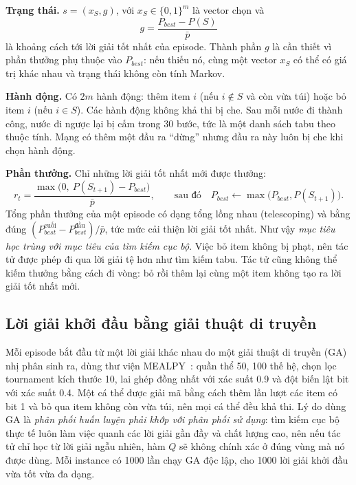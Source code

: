 \textbf{Trạng thái.} $s=(x_S,g)$, với $x_S\in\{0,1\}^m$ là vector chọn và
\begin{equation}
g=\frac{P_{best}-P(S)}{\bar p}
\end{equation}
là khoảng cách tới lời giải tốt nhất của episode. Thành phần $g$ là cần thiết vì phần thưởng phụ thuộc vào $P_{best}$: nếu thiếu nó, cùng một vector $x_S$ có thể có giá trị khác nhau và trạng thái không còn tính Markov.

\textbf{Hành động.} Có $2m$ hành động: thêm item $i$ (nếu $i\notin S$ và còn vừa túi) hoặc bỏ item $i$ (nếu $i\in S$). Các hành động không khả thi bị che. Sau mỗi nước đi thành công, nước đi ngược lại bị cấm trong 30 bước, tức là một danh sách tabu theo thuộc tính. Mạng có thêm một đầu ra ``dừng'' nhưng đầu ra này luôn bị che khi chọn hành động.

\textbf{Phần thưởng.} Chỉ những lời giải tốt nhất mới được thưởng:
\begin{equation}
r_t=\frac{\max\big(0,\ P(S_{t+1})-P_{best}\big)}{\bar p},
\qquad\text{sau đó}\quad P_{best}\leftarrow\max\big(P_{best},P(S_{t+1})\big).
\label{eq:reward}
\end{equation}
Tổng phần thưởng của một episode có dạng tổng lồng nhau (telescoping) và bằng đúng $(P_{best}^{\text{cuối}}-P_{best}^{\text{đầu}})/\bar p$, tức mức cải thiện lời giải tốt nhất. Như vậy \emph{mục tiêu học trùng với mục tiêu của tìm kiếm cục bộ}. Việc bỏ item không bị phạt, nên tác tử được phép đi qua lời giải tệ hơn như tìm kiếm tabu. Tác tử cũng không thể kiếm thưởng bằng cách đi vòng: bỏ rồi thêm lại cùng một item không tạo ra lời giải tốt nhất mới.

\subsection{Lời giải khởi đầu bằng giải thuật di truyền}

Mỗi episode bắt đầu từ một lời giải khác nhau do một giải thuật di truyền (GA) nhị phân sinh ra, dùng thư viện MEALPY~\cite{VanThieu2023}: quần thể 50, 100 thế hệ, chọn lọc tournament kích thước 10, lai ghép đồng nhất với xác suất 0.9 và đột biến lật bit với xác suất 0.4. Một cá thể được giải mã bằng cách thêm lần lượt các item có bit 1 và bỏ qua item không còn vừa túi, nên mọi cá thể đều khả thi. Lý do dùng GA là \emph{phân phối huấn luyện phải khớp với phân phối sử dụng}: tìm kiếm cục bộ thực tế luôn làm việc quanh các lời giải gần đầy và chất lượng cao, nên nếu tác tử chỉ học từ lời giải ngẫu nhiên, hàm $Q$ sẽ không chính xác ở đúng vùng mà nó được dùng. Mỗi instance có 1000 lần chạy GA độc lập, cho 1000 lời giải khởi đầu vừa tốt vừa đa dạng.

